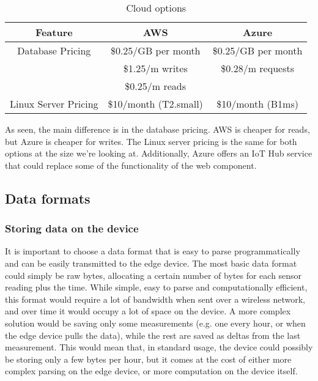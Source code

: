 \begin{table}[!h]
    \centering
    \begin{tabular}{c c c}
        \hline
        \textbf{Feature} & \textbf{AWS} & \textbf{Azure} \\
        \hline
        Database Pricing &
            \$0.25/GB per month & \$0.25/GB per month \\
         & \$1.25/m writes & \$0.28/m requests \\
         & \$0.25/m reads \\
         \hline
        Linux Server Pricing &
            \$10/month (T2.small) & 
            \$10/month (B1ms) \\
        \hline
        \end{tabular}
    \caption{Cloud options}
    \label{tab:cloud_options}
\end{table}

As seen, the main difference is in the database pricing. AWS is cheaper for reads,
but Azure is cheaper for writes. The Linux server pricing is the same for both options
at the size we're looking at. Additionally, Azure offers an IoT Hub service that
could replace some of the functionality of the web component.
\subsection{Data formats}
\subsubsection*{Storing data on the device}
It is important to choose a data format that is easy to parse programmatically and
can be easily transmitted to the edge device. The most basic data format could simply
be raw bytes, allocating a certain number of bytes for each sensor reading plus the
time. While simple, easy to parse and computationally efficient, this format would
require a lot of bandwidth when sent over a wireless network, and over time it would
occupy a lot of space on the device. A more complex solution would be saving only some
measurements (e.g. one every hour, or when the edge device pulls the data), while
the rest are saved as deltas from the last measurement. This would mean that, in
standard usage, the device could possibly be storing only a few bytes per hour, but
it comes at the cost of either more complex parsing on the edge device, or more
computation on the device itself.
